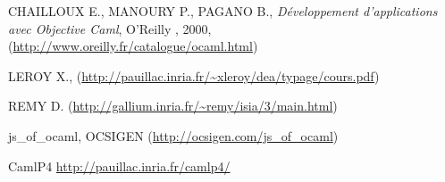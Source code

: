 \documentclass[a4paper, 11pt]{article}
\begin{document}
\begin{thebibliography}{}

 CHAILLOUX E., MANOURY P., PAGANO B., \emph{Développement
  d'applications avec Objective Caml}, O'Reilly
, 2000, (\url{http://www.oreilly.fr/catalogue/ocaml.html})


 LEROY X., \emph{} (\url{http://pauillac.inria.fr/~xleroy/dea/typage/cours.pdf})

 REMY D. (\url{http://gallium.inria.fr/~remy/isia/3/main.html})

 js\_of\_ocaml, OCSIGEN (\url{http://ocsigen.com/js_of_ocaml})

 CamlP4 \url{http://pauillac.inria.fr/camlp4/}


\end{thebibliography}































\end{document}
